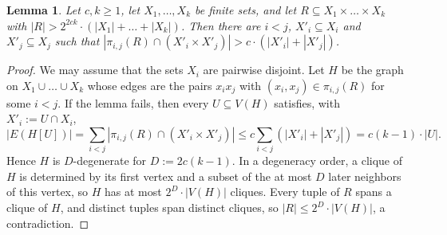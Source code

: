 \documentclass[11pt]{article}
\newtheorem{lemma}[theorem]{Lemma}
\theoremstyle{definition}
\renewcommand{\le}{\leqslant}
\renewcommand{\ge}{\geqslant}
\begin{document}
\begin{lemma}\label{lem:projection}
Let $c, k \ge 1$, let $X_1, \dots, X_k$ be finite sets, and let $R \subseteq X_1 \times \dots \times X_k$ with $|R| > 2^{2ck} \cdot (|X_1| + \dots + |X_k|)$.
Then there are $i < j$, $X'_i \subseteq X_i$ and $X'_j \subseteq X_j$ such that $|\pi_{i,j}(R) \cap (X'_i \times X'_j)| > c \cdot (|X'_i| + |X'_j|)$.
\end{lemma}
\begin{proof}
We may assume that the sets $X_i$ are pairwise disjoint.
Let $H$ be the graph on $X_1 \cup \dots \cup X_k$ whose edges are the pairs $x_i x_j$ with $(x_i, x_j) \in \pi_{i,j}(R)$ for some $i < j$.
If the lemma fails, then every $U \subseteq V(H)$ satisfies, with $X'_i := U \cap X_i$,
\[
  |E(H[U])| = \sum_{i < j} |\pi_{i,j}(R) \cap (X'_i \times X'_j)| \le c \sum_{i < j} (|X'_i| + |X'_j|) = c (k - 1) \cdot |U|.
\]
Hence $H$ is $D$-degenerate for $D := 2c(k-1)$.
In a degeneracy order, a clique of $H$ is determined by its first vertex and a subset of the at most $D$ later neighbors of this vertex, so $H$ has at most $2^D \cdot |V(H)|$ cliques.
Every tuple of $R$ spans a clique of $H$, and distinct tuples span distinct cliques, so $|R| \le 2^D \cdot |V(H)|$, a contradiction.
\end{proof}
\end{document}
